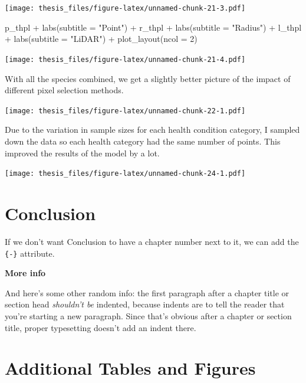 \documentclass[12pt,twoside]{reedthesis}
\newenvironment{Shaded}{\begin{snugshade}}{\end{snugshade}}
\newcommand{\AttributeTok}[1]{\textcolor[rgb]{0.77,0.63,0.00}{#1}}
\newcommand{\DecValTok}[1]{\textcolor[rgb]{0.00,0.00,0.81}{#1}}
\newcommand{\FunctionTok}[1]{\textcolor[rgb]{0.00,0.00,0.00}{#1}}
\newcommand{\NormalTok}[1]{#1}
\newcommand{\SpecialCharTok}[1]{\textcolor[rgb]{0.00,0.00,0.00}{#1}}
\newcommand{\StringTok}[1]{\textcolor[rgb]{0.31,0.60,0.02}{#1}}
\begin{document}
\texttt{[image: thesis\_files/figure-latex/unnamed-chunk-21-3.pdf]}
\begin{Shaded}
\begin{Highlighting}[]
\NormalTok{p\_thpl }\SpecialCharTok{+} \FunctionTok{labs}\NormalTok{(}\AttributeTok{subtitle =} \StringTok{"Point"}\NormalTok{) }\SpecialCharTok{+}\NormalTok{ r\_thpl }\SpecialCharTok{+} \FunctionTok{labs}\NormalTok{(}\AttributeTok{subtitle =} \StringTok{"Radius"}\NormalTok{) }\SpecialCharTok{+}
\NormalTok{    l\_thpl }\SpecialCharTok{+} \FunctionTok{labs}\NormalTok{(}\AttributeTok{subtitle =} \StringTok{"LiDAR"}\NormalTok{) }\SpecialCharTok{+} \FunctionTok{plot\_layout}\NormalTok{(}\AttributeTok{ncol =} \DecValTok{2}\NormalTok{)}
\end{Highlighting}
\end{Shaded}
\texttt{[image: thesis\_files/figure-latex/unnamed-chunk-21-4.pdf]}

With all the species combined, we get a slightly better picture of the impact of different pixel selection methods.

\texttt{[image: thesis\_files/figure-latex/unnamed-chunk-22-1.pdf]}

Due to the variation in sample sizes for each health condition category, I sampled down the data so each health category had the same number of points. This improved the results of the model by a lot.

\texttt{[image: thesis\_files/figure-latex/unnamed-chunk-24-1.pdf]}

\hypertarget{conclusion}{%
\chapter*{Conclusion}\label{conclusion}}

If we don't want Conclusion to have a chapter number next to it, we can add the \texttt{\{-\}} attribute.

\textbf{More info}

And here's some other random info: the first paragraph after a chapter title or section head \emph{shouldn't be} indented, because indents are to tell the reader that you're starting a new paragraph. Since that's obvious after a chapter or section title, proper typesetting doesn't add an indent there.

\appendix

\hypertarget{additional-tables-and-figures}{%
\chapter{Additional Tables and Figures}\label{additional-tables-and-figures}}
\end{document}
